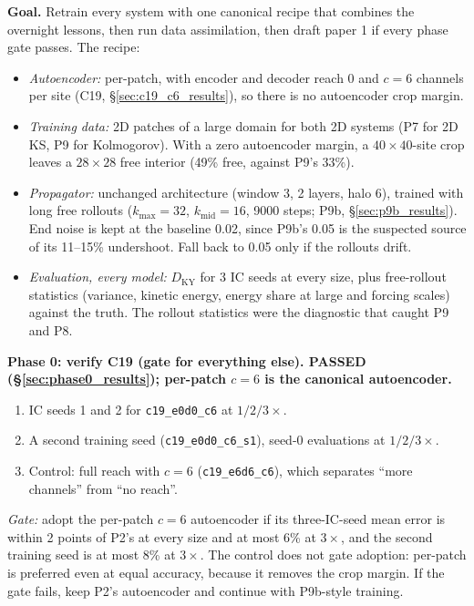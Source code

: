 \documentclass[11pt]{article}
\begin{document}
\textbf{Goal.} Retrain every system with one canonical recipe that
combines the overnight lessons, then run data assimilation, then draft
paper 1 if every phase gate passes. The recipe:
\begin{itemize}[leftmargin=*]
\item \emph{Autoencoder:} per-patch, with encoder and decoder reach 0 and
  $c{=}6$ channels per site (C19, \S\ref{sec:c19_c6_results}), so
  there is no autoencoder crop margin.
\item \emph{Training data:} 2D patches of a large domain for both 2D
  systems (P7 for 2D KS, P9 for Kolmogorov). With a zero autoencoder
  margin, a $40\times40$-site crop leaves a $28\times28$ free interior
  (49\% free, against P9's 33\%).
\item \emph{Propagator:} unchanged architecture (window 3, 2 layers,
  halo 6), trained with long free rollouts ($k_{\max}{=}32$,
  $k_{\mathrm{mid}}{=}16$, 9000 steps; P9b, \S\ref{sec:p9b_results}).
  End noise is kept at the baseline 0.02, since P9b's 0.05 is the
  suspected source of its 11--15\% undershoot. Fall back to 0.05 only if
  the rollouts drift.
\item \emph{Evaluation, every model:} $D_{\mathrm{KY}}$ for 3 IC seeds at
  every size, plus free-rollout statistics (variance, kinetic energy,
  energy share at large and forcing scales) against the truth. The
  rollout statistics were the diagnostic that caught P9 and P8.
\end{itemize}

\textbf{Phase 0: verify C19 (gate for everything else). PASSED
(\S\ref{sec:phase0_results}); per-patch $c{=}6$ is the canonical
autoencoder.}
\begin{enumerate}[leftmargin=*]
\item IC seeds 1 and 2 for \texttt{c19\_e0d0\_c6} at $1/2/3\times$.
\item A second training seed (\texttt{c19\_e0d0\_c6\_s1}), seed-0
  evaluations at $1/2/3\times$.
\item Control: full reach with $c{=}6$ (\texttt{c19\_e6d6\_c6}), which
  separates ``more channels'' from ``no reach''.
\end{enumerate}
\emph{Gate:} adopt the per-patch $c{=}6$ autoencoder if its three-IC-seed
mean error is within 2 points of P2's at every size and at most 6\% at
$3\times$, and the second training seed is at most 8\% at $3\times$. The
control does not gate adoption: per-patch is preferred even at equal
accuracy, because it removes the crop margin. If the gate fails, keep
P2's autoencoder and continue with P9b-style training.
\end{document}
